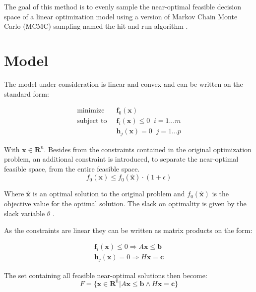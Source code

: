 \documentclass[11pt,a4paper,english]{article}
\begin{document}
	
The goal of this method is to evenly sample the near-optimal feasible decision space of a linear optimization model using a version of Markov Chain Monte Carlo (MCMC) sampling named the hit and run algorithm \cite{chen_fast_nodate, kiatsupaibul_analysis_2011}.
	
\section{Model}

The model under consideration is linear and convex and can be written on the standard form: 

\begin{align}\label{eq:ConvexOptimization}
\text{minimize} \;&\; \mathbf{f}_0(\mathbf{x})  \\
	\text{subject to} \; &\; \mathbf{f}_i(\mathbf{x}) \leq 0 \; \; i=1...m\\
\;            &\;  \mathbf{h}_j(\mathbf{x}) = 0 \; \; j=1...p
\end{align}

With $\mathbf{x}\in \mathbf{R}^n$. Besides from the constraints contained in the original optimization problem, an additional constraint is introduced, to separate the near-optimal feasible space, from the entire feasible space. 
\begin{equation}\label{eq:MGA_const}
f_0(\mathbf{x}) \leq f_0(\mathbf{\hat{x}})\cdot (1+\epsilon)
\end{equation}

Where $\mathbf{\hat{x}}$ is an optimal solution to the original problem and $f_0(\mathbf{\hat{x}})$ is the objective value for the optimal solution. The slack on optimality is given by the slack variable $\theta$ .

As the constraints are linear they can be written as matrix products on the form: 

\begin{align}
\mathbf{f}_i(\mathbf{x}) \leq 0 \Rightarrow A  \mathbf{x}  \leq \mathbf{b} \\
\mathbf{h}_j(\mathbf{x}) = 0 \Rightarrow H  \mathbf{x} = \mathbf{c}
\end{align}

The set containing all feasible near-optimal solutions then become:
\begin{equation}
F = \{\mathbf{x} \in \mathbf{R}^n | A  \mathbf{x}  \leq \mathbf{b} \wedge H  \mathbf{x} = \mathbf{c} \}
\end{equation}
\end{document}
